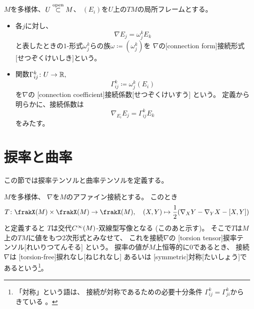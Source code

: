 \documentclass[report]{jlreq}
\begin{document}
\begin{definition}[接続形式]
    $M$を多様体、$U \stackrel{\text{open}}{\subset} M$、
    $(E_i)$を$U$上の$TM$の局所フレームとする。
    \begin{itemize}
        \item 各$j$に対し、
            \begin{equation}
                \nabla E_j = \omega^k_j E_k
            \end{equation}
            と表したときの$1$-形式$\omega^k_j$らの族$\omega \coloneqq (\omega^k_j)$を
            $\nabla$の[connection form]{接続形式}[せつぞくけいしき]という。
        \item {\smooth}関数$\Gamma_{ij}^k \colon U \to \mathbb{R},$
            \begin{equation}
                \Gamma^k_{ij} \coloneqq \omega^k_j(E_i)
            \end{equation}
            を$\nabla$の
            [connection coefficient]{接続係数}[せつぞくけいすう]
            という。
            定義から明らかに、接続係数は
            \begin{equation}
                \nabla_{E_i} E_j = \Gamma^k_{ij} E_k
            \end{equation}
            をみたす。
    \end{itemize}
\end{definition}


%
\section{捩率と曲率}

この節では捩率テンソルと曲率テンソルを定義する。

\begin{definition}[捩率テンソル]
    $M$を多様体、
    $\nabla$を$M$のアファイン接続とする。
    このとき
    \begin{equation}
        T \colon \frakX(M) \times \frakX(M) \to \frakX(M),
        \quad
        (X, Y) \mapsto \frac{1}{2} (\nabla_X Y - \nabla_Y X - [X, Y])
    \end{equation}
    と定義すると
    $T$は交代$C^\infty(M)$-双線型写像となる (このあと示す)。
    そこで$T$は$M$上の$TM$に値をもつ2次形式とみなせて、
    これを接続$\nabla$の
    [torsion tensor]{捩率テンソル}[れいりつてんそる]
    という。
    捩率の値が$M$上恒等的に$0$であるとき、
    接続$\nabla$は
    [torsion-free]{捩れなし}[ねじれなし]
    あるいは
    [symmetric]{対称}[たいしょう]であるという\footnote{
        「対称」という語は、
        接続が対称であるための必要十分条件
        $\Gamma^k_{ij} = \Gamma^k_{ji}$からきている
        \cite[p.121]{Lee18}。
    }。
\end{definition}
\end{document}
